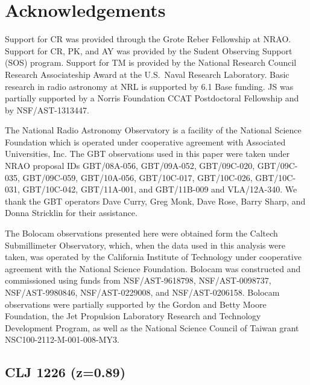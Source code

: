 \documentclass[iop,numberedappendix,apj]{emulateapj}
\begin{document}
{\section*{Acknowledgements}

Support for CR was provided through the Grote Reber Fellowship at NRAO. Support for CR, PK, and AY was 
provided by the Sudent Observing Support (SOS) program. Support for TM is provided by the National Research 
Council Research Associateship Award at the U.S.\ Naval Research Laboratory. Basic research in radio 
astronomy at NRL is supported by 6.1 Base funding. JS was partially supported by a
Norris Foundation CCAT Postdoctoral Fellowship and by NSF/AST-1313447.

The National Radio Astronomy Observatory is a facility of the National Science Foundation which is operated
under cooperative agreement with Associated Universities, Inc. The GBT observations used in this paper were
taken under NRAO proposal IDs GBT/08A-056, GBT/09A-052, GBT/09C-020, GBT/09C-035, GBT/09C-059, GBT/10A-056, 
GBT/10C-017, GBT/10C-026, GBT/10C-031, GBT/10C-042, GBT/11A-001, and GBT/11B-009 and VLA/12A-340.
We  thank the GBT operators Dave Curry, Greg Monk, Dave Rose, Barry Sharp, and Donna Stricklin for their
assistance. 

The Bolocam observations presented here were obtained form the Caltech Submillimeter Observatory, which,
when the data used in this analysis were taken, was operated by the California Institute of Technology under
cooperative agreement with the National Science Foundation. Bolocam was constructed and commissioned using funds
from NSF/AST-9618798, NSF/AST-0098737, NSF/AST-9980846, NSF/AST-0229008, and NSF/AST-0206158. Bolocam observations
were partially supported by the Gordon and Betty Moore Foundation, the Jet Propulsion Laboratory Research and
Technology Development Program, as well as the National Science Council of Taiwan grant NSC100-2112-M-001-008-MY3.



\appendix


\subsection{CLJ 1226 (z=0.89)}
\label{sec:results_clj1226}

}
\end{document}
